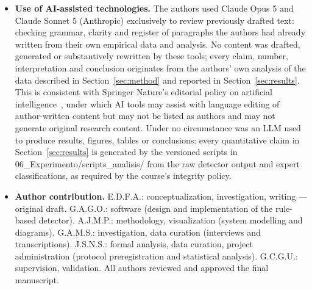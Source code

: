 \documentclass[pdflatex,sn-mathphys-num]{sn-jnl}
\theoremstyle{thmstyleone}%
\theoremstyle{thmstyletwo}%
\theoremstyle{thmstylethree}%
\begin{document}
\begin{itemize}
		deposit above.
		\item \textbf{Use of AI-assisted technologies.} The authors used Claude Opus 5
		and Claude Sonnet 5 (Anthropic) exclusively to review previously drafted text:
		checking grammar, clarity and register of paragraphs the authors had already
		written from their own empirical data and analysis. No content was drafted,
		generated or substantively rewritten by these tools; every claim, number,
		interpretation and conclusion originates from the authors' own analysis of the
		data described in Section~\ref{sec:method} and reported in
		Section~\ref{sec:results}. This is consistent with Springer Nature's editorial
		policy on artificial intelligence~\cite{springer2023}, under which AI tools may
		assist with language editing of author-written content but may not be listed as
		authors and may not generate original research content. Under no circumstance
		was an LLM used to produce results, figures, tables or conclusions: every
		quantitative claim in Section~\ref{sec:results} is generated by the versioned
		scripts in 06\_Experimento/scripts\_analisis/ from the raw detector output and
		expert classifications, as required by the course's integrity policy.
		\item \textbf{Author contribution.} E.D.F.A.: conceptualization,
		investigation, writing --- original draft. G.A.G.O.: software (design and
		implementation of the rule-based detector). A.J.M.P.: methodology,
		visualization (system modelling and diagrams). G.A.M.S.: investigation, data
		curation (interviews and transcriptions). J.S.N.S.: formal analysis, data
		curation, project administration (protocol preregistration and statistical
		analysis). G.C.G.U.: supervision, validation. All authors reviewed and approved
		the final manuscript.
	\end{itemize}
	
	
	
\end{document}
